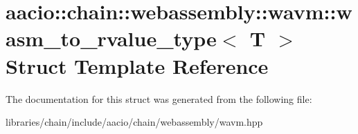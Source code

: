 \hypertarget{structaacio_1_1chain_1_1webassembly_1_1wavm_1_1wasm__to__rvalue__type}{}\section{aacio\+:\+:chain\+:\+:webassembly\+:\+:wavm\+:\+:wasm\+\_\+to\+\_\+rvalue\+\_\+type$<$ T $>$ Struct Template Reference}
\label{structaacio_1_1chain_1_1webassembly_1_1wavm_1_1wasm__to__rvalue__type}


The documentation for this struct was generated from the following file\+:\begin{DoxyCompactItemize}
\item 
libraries/chain/include/aacio/chain/webassembly/wavm.\+hpp\end{DoxyCompactItemize}
